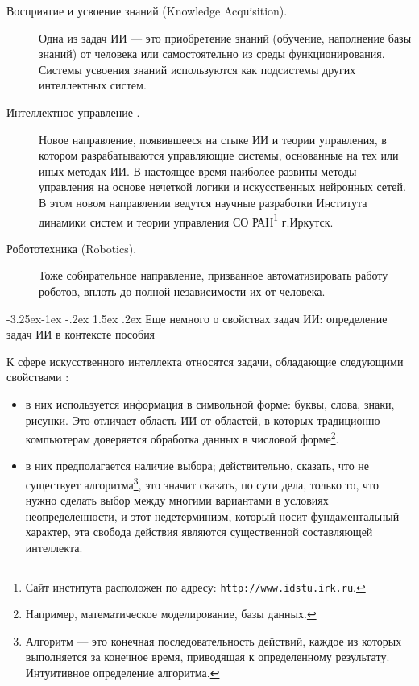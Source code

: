\documentclass[12pt, openany, twoside]{book} %
\makeatletter
\renewcommand\subsection{\@startsection{subsection}{2}{\z@}%
                                     {-3.25ex\@plus -1ex \@minus -.2ex}%
                                     {1.5ex \@plus .2ex}%
                                     {\normalfont\normalsize\bfseries}}
\makeatother
\begin{document}
\begin{description}
 \item [Восприятие и усвоение знаний (Knowledge Acquisition).] Одна из задач ИИ --- это приобретение знаний (обучение, наполнение базы знаний) от человека или самостоятельно из среды функционирования. Системы усвоения знаний используются как подсистемы других интеллектных систем.
 \item [Интеллектное управление \cite{Vass:2000}.] Новое направление, появившееся на стыке ИИ и теории управления, в котором разрабатываются управляющие системы, основанные на тех или иных методах ИИ. В настоящее время наиболее развиты методы управления на основе нечеткой логики и искусственных нейронных сетей. В этом новом направлении ведутся научные разработки Института динамики систем и теории управления СО РАН\footnote{Сайт института расположен по адресу: {\tt http://www.idstu.irk.ru}.} г.Иркутск.
\item [Робототехника (Robotics).] Тоже собирательное направление, призванное авто\-ма\-ти\-зировать работу роботов, вплоть до полной независимости их от человека.
\end{description}

\subsection{Еще немного о свойствах задач ИИ: определение задач ИИ в контексте пособия}

К сфере искусственного интеллекта относятся задачи, обладающие следующими свойствами \cite{Lauriere}:
 \begin{itemize}
 \item в них используется информация в символьной форме: буквы, слова, знаки, рисунки. Это отличает область ИИ от областей, в которых традиционно компьютерам доверяется обработка данных в числовой форме\footnote{Например, математическое моделирование, базы данных.}.
  \item в них предполагается наличие выбора; действительно, сказать, что не существует алгоритма\footnote{Алгоритм --- это конечная последовательность действий, каждое из которых выполняется за конечное время, приводящая к определенному результату. Интуитивное определение алгоритма.}, это значит сказать, по сути дела, только то, что нужно сделать выбор между многими вариантами в условиях неопределенности, и этот недетерминизм, который носит фундаментальный характер, эта свобода действия являются существенной составляющей интеллекта.
 \end{itemize}
\end{document}
